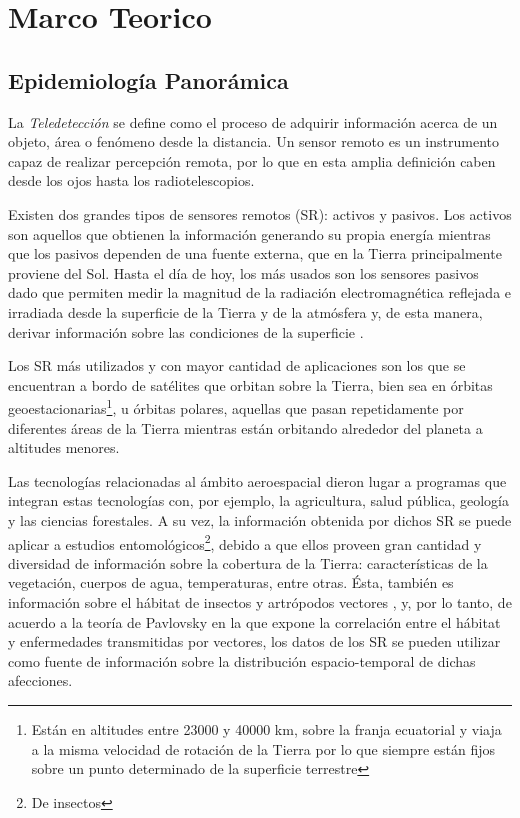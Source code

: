 %
%
%

\chapter{Marco Teorico}

\section{Epidemiología Panorámica}

\justifying


\par La \textit{Teledetección} se define como el proceso de adquirir
  información acerca de un objeto, área o fenómeno desde la distancia.
  Un sensor remoto es un instrumento capaz de realizar percepción remota, por lo
  que en esta amplia definición caben desde los ojos hasta los
  radiotelescopios.

\par Existen dos grandes tipos de sensores remotos (SR): activos y pasivos.
  Los activos son aquellos que obtienen la información generando su propia energía
  mientras que los pasivos dependen de una fuente externa, que en la Tierra
  principalmente proviene del Sol. Hasta el día de hoy, los más usados son los
  sensores pasivos dado que permiten medir la magnitud de la radiación electromagnética
  reflejada e irradiada desde la superficie de la Tierra y de la atmósfera y,
  de esta manera, derivar información sobre las condiciones de la superficie \cite{cami_tartagal}.


\par Los SR más utilizados y con mayor cantidad de aplicaciones son los que se
  encuentran a bordo de satélites que orbitan sobre la Tierra, bien sea
  en órbitas geoestacionarias\footnote{Están en altitudes entre 23000 y 40000 km,
  sobre la franja ecuatorial y viaja a la misma velocidad de rotación de la Tierra
  por lo que siempre están fijos sobre un punto determinado de la superficie terrestre},
  u órbitas polares, aquellas que pasan repetidamente por diferentes áreas
  de la Tierra mientras están orbitando alrededor del planeta a altitudes menores.


\par Las tecnologías relacionadas al ámbito aeroespacial dieron lugar a programas
  que integran estas tecnologías con,
  por ejemplo, la agricultura, salud pública, geología y las ciencias forestales.
  A su vez, la información obtenida por dichos SR se puede aplicar a estudios
  entomológicos\footnote{De insectos}, debido a que ellos proveen gran cantidad
  y diversidad de información sobre la cobertura de la Tierra: características
  de la vegetación, cuerpos de agua, temperaturas, entre otras. Ésta, también es
  información sobre el hábitat de insectos y artrópodos vectores \cite{ndwi_erffectiveness, data_driven_prediction},
  y, por lo tanto, de acuerdo a la teoría de Pavlovsky \cite{nidality} en la que
  expone la correlación entre el hábitat y enfermedades transmitidas por vectores,
  los datos de los SR se pueden utilizar como fuente de información sobre la
  distribución espacio-temporal de dichas afecciones.


